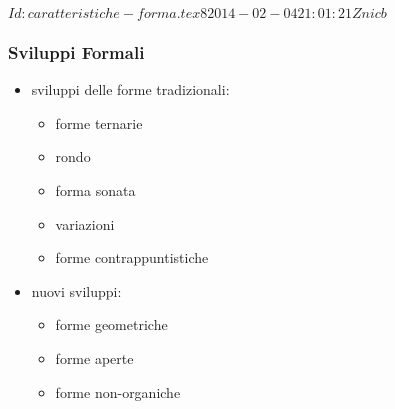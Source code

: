%
%
\svnInfo $Id: caratteristiche-forma.tex 8 2014-02-04 21:01:21Z nicb $

\setcounter{ms}{0}
\begin{frame}
    \frametitle{Sviluppi Formali}

    \begin{itemize}

        \item sviluppi delle forme tradizionali:

        \begin{itemize}

            \item forme ternarie
            \item rondo
            \item forma sonata
            \item variazioni
            \item forme contrappuntistiche

        \end{itemize}

        \item nuovi sviluppi:

            \begin{itemize}

                \item forme geometriche
                \item forme aperte
                \item forme non-organiche

            \end{itemize}

    \end{itemize}

\end{frame}

